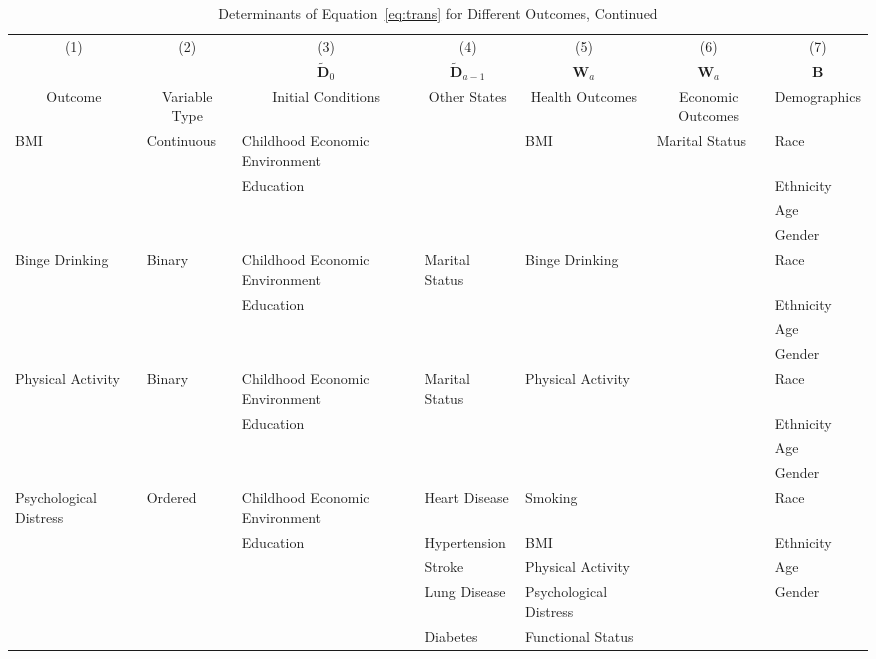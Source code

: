 \begin{table}
\caption{Determinants of Equation~\eqref{eq:trans} for Different Outcomes, Continued} \label{table:supertab2}
\begin{scriptsize}
\begin{tabular}{lllllll}
\toprule 
\multicolumn{1}{c}{(1)} & \multicolumn{1}{c}{(2)} & \multicolumn{1}{c}{(3)} & \multicolumn{1}{c}{(4)} & \multicolumn{1}{c}{(5)} & \multicolumn{1}{c}{(6)} & \multicolumn{1}{c}{(7)} \\
 & &  \multicolumn{1}{c}{$\tilde{\bm{D}}_0$} &  \multicolumn{1}{c}{$\tilde{\bm{D}}_{a-1}$} & \multicolumn{1}{c}{ $\bm{W}_a$ } &  \multicolumn{1}{c}{ $\bm{W}_a$ } &  \multicolumn{1}{c}{$\bm{B}$} \\ 
\multicolumn{1}{c}{Outcome} & \multicolumn{1}{c}{Variable Type} & \multicolumn{1}{c}{Initial Conditions} & \multicolumn{1}{c}{Other States} & \multicolumn{1}{c}{Health Outcomes} & \multicolumn{1}{c}{Economic Outcomes} & \multicolumn{1}{c}{Demographics} \\
\midrule
BMI & Continuous & Childhood Economic Environment & & BMI & Marital Status & Race \\
& & Education & & & & Ethnicity \\
 & &  & & & & Age \\
 &  & & & & & Gender \\
\midrule
Binge Drinking & Binary & Childhood Economic Environment &  Marital Status & Binge Drinking & & Race \\
 & & Education &  &  & & Ethnicity \\
  & &  &  &  & & Age \\
  &  & &  &  & & Gender \\
\midrule
Physical Activity & Binary & Childhood Economic Environment & Marital Status & Physical Activity & & Race \\
 & & Education &  & & & Ethnicity \\
  & &  &  &  & & Age \\
  &  & &  &  & & Gender \\
\midrule
Psychological Distress & Ordered & Childhood Economic Environment & Heart Disease & Smoking & & Race \\
 & & Education & Hypertension & BMI & & Ethnicity \\
 &  &  & Stroke & Physical Activity & & Age \\
   & & & Lung Disease & Psychological Distress & & Gender \\
    & & & Diabetes & Functional Status & & \\

\end{tabular}
\end{scriptsize}
\end{table}
